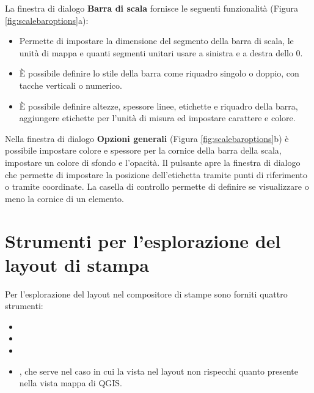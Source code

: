 
La finestra di dialogo \textbf{Barra di scala} fornisce le seguenti funzionalità (Figura \ref{fig:scalebaroptions}a):

\begin{itemize}[label=--]

\item Permette di impostare la dimensione del segmento della barra di scala, le unità di mappa e quanti segmenti unitari usare 
a sinistra e a destra dello 0.
\item È possibile definire lo stile della barra come riquadro singolo o doppio, con tacche verticali o numerico.
\item È possibile definire altezze, spessore linee, etichette e riquadro della barra, aggiungere etichette per l'unità di misura 
ed impostare carattere e colore.
\end{itemize}


Nella finestra di dialogo \textbf{Opzioni generali} (Figura \ref{fig:scalebaroptions}b) è possibile impostare colore e spessore per la cornice della barra della scala, impostare 
un colore di sfondo e l'opacità. Il pulsante  apre la finestra di 
dialogo  che permette di impostare la posizione dell'etichetta 
tramite punti di riferimento o tramite coordinate.
La casella di controllo  permette di definire se visualizzare o 
meno la cornice di un elemento.

\section{Strumenti per l'esplorazione del layout di stampa}

Per l'esplorazione del layout nel compositore di stampe sono forniti quattro
strumenti:

\begin{itemize}
\item {}
\item {}
\item {}
\item {}, che serve nel caso in cui
la vista nel layout non rispecchi quanto presente nella vista mappa di QGIS. 
\end{itemize}

